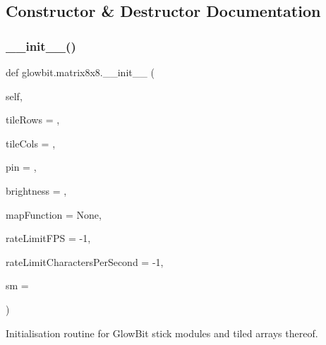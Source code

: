 \subsection{Constructor \& Destructor Documentation}
\mbox{\label{classglowbit_1_1matrix8x8_a7b30f3aec73c8a938a063ea640899af6}} 
\subsubsection{\texorpdfstring{\+\_\+\+\_\+init\+\_\+\+\_\+()}{\_\_init\_\_()}}
{\footnotesize\ttfamily def glowbit.\+matrix8x8.\+\_\+\+\_\+init\+\_\+\+\_\+ (\begin{DoxyParamCaption}\item[{}]{self,  }\item[{}]{tile\+Rows = {},  }\item[{}]{tile\+Cols = {},  }\item[{}]{pin = {},  }\item[{}]{brightness = {},  }\item[{}]{map\+Function = {\ttfamily None},  }\item[{}]{rate\+Limit\+F\+PS = {\ttfamily -\/1},  }\item[{}]{rate\+Limit\+Characters\+Per\+Second = {\ttfamily -\/1},  }\item[{}]{sm = {} }\end{DoxyParamCaption})}



Initialisation routine for Glow\+Bit stick modules and tiled arrays thereof. 


